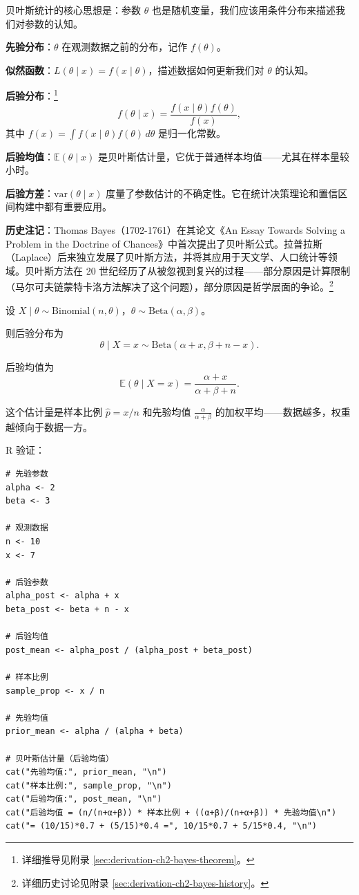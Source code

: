 贝叶斯统计的核心思想是：参数 $\theta$ 也是随机变量，我们应该用条件分布来描述我们对参数的认知。

\textbf{先验分布}：$\theta$ 在观测数据之前的分布，记作 $f(\theta)$。

\textbf{似然函数}：$L(\theta \mid x) = f(x \mid \theta)$，描述数据如何更新我们对 $\theta$ 的认知。

\textbf{后验分布}：\footnote{详细推导见附录 \cref{sec:derivation-ch2-bayes-theorem}。}
\[
f(\theta \mid x) = \frac{f(x \mid \theta) f(\theta)}{f(x)},
\]
其中 $f(x) = \int f(x \mid \theta) f(\theta) \, d\theta$ 是归一化常数。

\textbf{后验均值}：$\mathbb{E}(\theta \mid x)$ 是贝叶斯估计量，它优于普通样本均值——尤其在样本量较小时。

\textbf{后验方差}：$\text{var}(\theta \mid x)$ 度量了参数估计的不确定性。它在统计决策理论和置信区间构建中都有重要应用。

\textbf{历史注记}：Thomas Bayes（1702-1761）在其论文《An Essay Towards Solving a Problem in the Doctrine of Chances》中首次提出了贝叶斯公式。拉普拉斯（Laplace）后来独立发展了贝叶斯方法，并将其应用于天文学、人口统计等领域。贝叶斯方法在 20 世纪经历了从被忽视到复兴的过程——部分原因是计算限制（马尔可夫链蒙特卡洛方法解决了这个问题），部分原因是哲学层面的争论。\footnote{详细历史讨论见附录 \cref{sec:derivation-ch2-bayes-history}。}

\begin{example}\label{ex:beta-binomial-conjugate-ch2}
设 $X \mid \theta \sim \text{Binomial}(n, \theta)$，$\theta \sim \text{Beta}(\alpha, \beta)$。

则后验分布为
\[
\theta \mid X = x \sim \text{Beta}(\alpha + x, \beta + n - x).
\]

后验均值为
\[
\mathbb{E}(\theta \mid X = x) = \frac{\alpha + x}{\alpha + \beta + n}.
\]

这个估计量是样本比例 $\hat{p} = x/n$ 和先验均值 $\frac{\alpha}{\alpha+\beta}$ 的加权平均——数据越多，权重越倾向于数据一方。

R 验证：
\begin{verbatim}
# 先验参数
alpha <- 2
beta <- 3

# 观测数据
n <- 10
x <- 7

# 后验参数
alpha_post <- alpha + x
beta_post <- beta + n - x

# 后验均值
post_mean <- alpha_post / (alpha_post + beta_post)

# 样本比例
sample_prop <- x / n

# 先验均值
prior_mean <- alpha / (alpha + beta)

# 贝叶斯估计量（后验均值）
cat("先验均值:", prior_mean, "\n")
cat("样本比例:", sample_prop, "\n")
cat("后验均值:", post_mean, "\n")
cat("后验均值 = (n/(n+α+β)) * 样本比例 + ((α+β)/(n+α+β)) * 先验均值\n")
cat("= (10/15)*0.7 + (5/15)*0.4 =", 10/15*0.7 + 5/15*0.4, "\n")
\end{verbatim}
\end{example}
